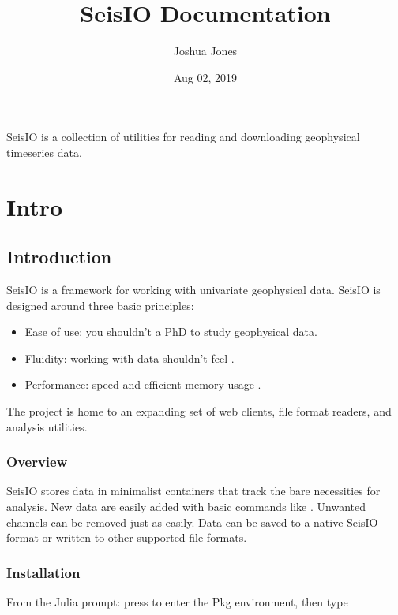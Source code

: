 \documentclass[letterpaper,11pt,english]{sphinxmanual}
\title{SeisIO Documentation}
\date{Aug 02, 2019}
\author{Joshua Jones}
\begin{document}
\pagestyle{empty}
\sphinxmaketitle
\pagestyle{plain}
\sphinxtableofcontents
\pagestyle{normal}
\label{\detokenize{index::doc}}


SeisIO is a collection of utilities for reading and downloading geophysical timeseries data.


\chapter{Intro}
\label{\detokenize{index:intro}}

\section{Introduction}
\label{\detokenize{src/intro:introduction}}\label{\detokenize{src/intro::doc}}
SeisIO is a framework for working with univariate geophysical data.
SeisIO is designed around three basic principles:
\begin{itemize}
\item {} 
Ease of use: you shouldn’t  a PhD to study geophysical data.

\item {} 
Fluidity: working with data shouldn’t feel .

\item {} 
Performance: speed and efficient memory usage .

\end{itemize}

The project is home to an expanding set of web clients, file format readers,
and analysis utilities.


\subsection{Overview}
\label{\detokenize{src/intro:overview}}
SeisIO stores data in minimalist containers that track the bare necessities for
analysis. New data are easily added with basic commands like \sphinxcode{\sphinxupquote{+}}. Unwanted
channels can be removed just as easily. Data can be saved to a native SeisIO
format or written to other supported file formats.


\subsection{Installation}
\label{\detokenize{src/intro:installation}}
From the Julia prompt: press \sphinxcode{\sphinxupquote{{]}}} to enter the Pkg environment, then type
\end{document}
